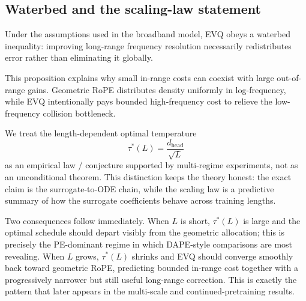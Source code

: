 \subsection{Waterbed and the scaling-law statement}

\begin{proposition}
Under the assumptions used in the broadband model, EVQ obeys a waterbed inequality: improving long-range frequency resolution necessarily redistributes error rather than eliminating it globally.
\end{proposition}

This proposition explains why small in-range costs can coexist with large out-of-range gains. Geometric RoPE distributes density uniformly in log-frequency, while EVQ intentionally pays bounded high-frequency cost to relieve the low-frequency collision bottleneck.

We treat the length-dependent optimal temperature
\begin{equation}
\tau^*(L) = \frac{d_{\mathrm{head}}}{\sqrt{L}}
\end{equation}
as an empirical law / conjecture supported by multi-regime experiments, not as an unconditional theorem. This distinction keeps the theory honest: the exact claim is the surrogate-to-ODE chain, while the scaling law is a predictive summary of how the surrogate coefficients behave across training lengths.

Two consequences follow immediately. When \(L\) is short, \(\tau^*(L)\) is large and the optimal schedule should depart visibly from the geometric allocation; this is precisely the PE-dominant regime in which DAPE-style comparisons are most revealing. When \(L\) grows, \(\tau^*(L)\) shrinks and EVQ should converge smoothly back toward geometric RoPE, predicting bounded in-range cost together with a progressively narrower but still useful long-range correction. This is exactly the pattern that later appears in the multi-scale and continued-pretraining results.
